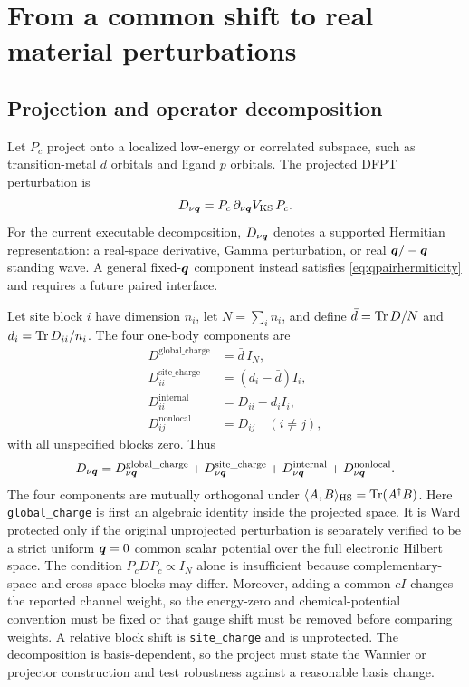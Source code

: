 \section{From a common shift to real material perturbations}
\label{sec:channels}

\subsection{Projection and operator decomposition}

Let $P_c$ project onto a localized low-energy or correlated subspace, such as
transition-metal $d$ orbitals and ligand $p$ orbitals.  The projected DFPT
perturbation is
\begin{equation}
  D_{\nu\bm{q}}=P_c\,\partial_{\nu\bm{q}}V_{\mathrm{KS}}\,P_c.
  \label{eq:projectedD}
\end{equation}
For the current executable decomposition, $D_{\nu\bm{q}}$ denotes a supported
Hermitian representation: a real-space derivative, Gamma perturbation, or real
$\bm{q}/-\bm{q}$ standing wave.  A general fixed-$\bm{q}$ component instead satisfies
\cref{eq:qpairhermiticity} and requires a future paired interface.

Let site block $i$ have dimension $n_i$, let $N=\sum_i n_i$, and define
$\bar d=\operatorname{Tr} D/N$ and $d_i=\operatorname{Tr} D_{ii}/n_i$.  The four one-body components are
\begin{align}
  D^{\mathrm{global\_charge}}&=\bar d\,I_N,
  \label{eq:chargechannel}\\
  D^{\mathrm{site\_charge}}_{ii}&=(d_i-\bar d)I_i,\\
  D^{\mathrm{internal}}_{ii}&=D_{ii}-d_iI_i,\\
  D^{\mathrm{nonlocal}}_{ij}&=D_{ij}\quad(i\ne j),
  \label{eq:internalchannel}
\end{align}
with all unspecified blocks zero.  Thus
\begin{equation}
  D_{\nu\bm{q}}
  =D^{\mathrm{global\_charge}}_{\nu\bm{q}}
  +D^{\mathrm{site\_charge}}_{\nu\bm{q}}
  +D^{\mathrm{internal}}_{\nu\bm{q}}
  +D^{\mathrm{nonlocal}}_{\nu\bm{q}}.
  \label{eq:channeldecomp}
\end{equation}
The four components are mutually orthogonal under
$\langle A,B\rangle_{\mathrm{HS}}=\operatorname{Tr}(A^\dagger B)$.  Here
\texttt{global\_charge} is first an algebraic identity inside the projected
space.  It is Ward protected only if the original unprojected perturbation is
separately verified to be a strict uniform $\bm{q}=0$ common scalar potential over
the full electronic Hilbert space.  The condition $P_cDP_c\propto I_N$ alone is
insufficient because complementary-space and cross-space blocks may differ.
Moreover, adding a common $cI$ changes the reported channel weight, so the
energy-zero and chemical-potential convention must be fixed or that gauge shift
must be removed before comparing weights.  A relative block shift is
\texttt{site\_charge} and is unprotected.  The decomposition is basis-dependent,
so the project must state the Wannier or projector construction and test
robustness against a reasonable basis change.

